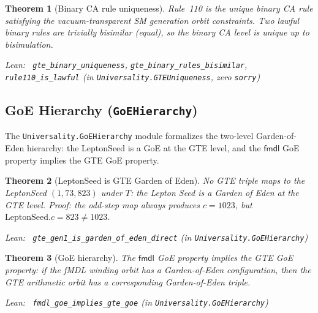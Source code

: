 \documentclass[11pt,a4paper]{article}
\newenvironment{leanref}%
  {\par\smallskip\noindent\begingroup\raggedright\textup{Lean:}~}%
  {\par\endgroup}
\newtheorem{theorem}{Theorem}[section]
\theoremstyle{definition}
\begin{document}
\begin{theorem}[Binary CA rule uniqueness]\label{thm:binary-rule-unique}
Rule~110 is the unique binary CA rule satisfying the vacuum-transparent
SM generation orbit constraints.  Two lawful binary rules are trivially bisimilar
(equal), so the binary CA level is unique up to bisimulation.

\begin{leanref}
\lstinline|gte_binary_uniqueness|,
\lstinline|gte_binary_rules_bisimilar|,
\lstinline|rule110_is_lawful|
\textup{(in \texttt{Universality.GTEUniqueness}, zero \texttt{sorry})}
\end{leanref}
\end{theorem}

\subsection{GoE Hierarchy (\texttt{GoEHierarchy})}\label{subsec:goe-hierarchy}

The \texttt{Universality.GoEHierarchy} module formalizes the two-level
Garden-of-Eden hierarchy: the LeptonSeed is a GoE at the GTE level, and the
$\mathsf{fmdl}$ GoE property implies the GTE GoE property.

\begin{theorem}[LeptonSeed is GTE Garden of Eden]\label{thm:gte-goe}
No GTE triple maps to the LeptonSeed $(1,73,823)$ under $T$: the Lepton Seed is
a Garden of Eden at the GTE level.  Proof: the odd-step map always produces
$c = 1023$, but $\text{LeptonSeed}.c = 823 \ne 1023$.

\begin{leanref}
\lstinline|gte_gen1_is_garden_of_eden_direct|
\textup{(in \texttt{Universality.GoEHierarchy})}
\end{leanref}
\end{theorem}

\begin{theorem}[GoE hierarchy]\label{thm:goe-hierarchy}
The $\mathsf{fmdl}$ GoE property implies the GTE GoE property: if the fMDL winding
orbit has a Garden-of-Eden configuration, then the GTE arithmetic orbit has a
corresponding Garden-of-Eden triple.

\begin{leanref}
\lstinline|fmdl_goe_implies_gte_goe|
\textup{(in \texttt{Universality.GoEHierarchy})}
\end{leanref}
\end{theorem}
\end{document}
